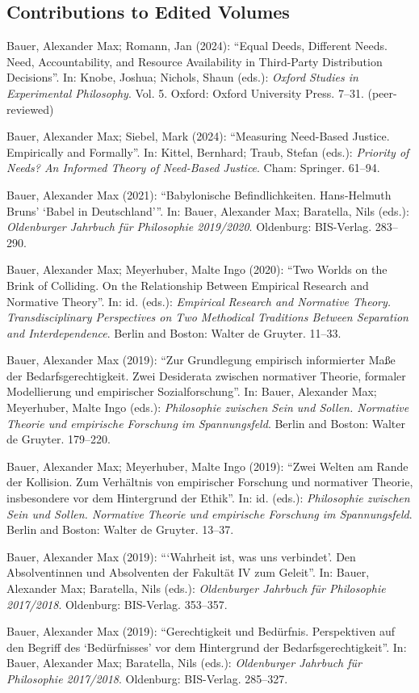 \documentclass[a4paper,10pt]{article}
\newenvironment{literature}{%
   \parskip6pt\parindent0pt\raggedright
   \def\lititem{\hangindent=1cm\hangafter1}}{%
   \par\ignorespaces}
\begin{document}
\subsection*{Contributions to Edited Volumes}
\begin{literature}
\lititem Bauer, Alexander Max; Romann, Jan (2024): \enquote{Equal Deeds, Different Needs. Need, Accountability, and Resource Availability in Third-Party Distribution Decisions}. In: Knobe, Joshua; Nichols, Shaun (eds.): \textit{Oxford Studies in Experimental Philosophy}. Vol. 5. Oxford: Oxford University Press. 7--31. (peer-reviewed)

\lititem Bauer, Alexander Max; Siebel, Mark (2024): \enquote{Measuring Need-Based Justice. Empirically and Formally}. In: Kittel, Bernhard; Traub, Stefan (eds.): \textit{Priority of Needs? An Informed Theory of Need-Based Justice}. Cham: Springer. 61--94.

\lititem Bauer, Alexander Max (2021): \enquote{Babylonische Befindlichkeiten. Hans-Helmuth Bruns' \enquote{Babel in Deutschland}}. In: Bauer, Alexander Max; Baratella, Nils (eds.): \textit{Oldenburger Jahrbuch für Philosophie 2019/2020}. Oldenburg: BIS-Verlag. 283--290.

\lititem Bauer, Alexander Max; Meyerhuber, Malte Ingo (2020): \enquote{Two Worlds on the Brink of Colliding. On the Relationship Between Empirical Research and Normative Theory}. In: id. (eds.): \textit{Empirical Research and Normative Theory. Transdisciplinary Perspectives on Two Methodical Traditions Between Separation and Interdependence}. Berlin and Boston: Walter de Gruyter. 11--33.

\lititem Bauer, Alexander Max (2019): \enquote{Zur Grundlegung empirisch informierter Maße der Bedarfsgerechtigkeit. Zwei Desiderata zwischen normativer Theorie, formaler Modellierung und empirischer Sozialforschung}. In: Bauer, Alexander Max; Meyerhuber, Malte Ingo (eds.): \textit{Philosophie zwischen Sein und Sollen. Normative Theorie und empirische Forschung im Spannungsfeld}. Berlin and Boston: Walter de Gruyter. 179--220.

\lititem Bauer, Alexander Max; Meyerhuber, Malte Ingo (2019): \enquote{Zwei Welten am Rande der Kollision. Zum Verhältnis von empirischer Forschung und normativer Theorie, insbesondere vor dem Hintergrund der Ethik}. In: id. (eds.): \textit{Philosophie zwischen Sein und Sollen. Normative Theorie und empirische Forschung im Spannungsfeld}. Berlin and Boston: Walter de Gruyter. 13--37.

\lititem Bauer, Alexander Max (2019): \enquote{\enquote{Wahrheit ist, was uns verbindet}. Den Absolventinnen und Absolventen der Fakultät IV zum Geleit}. In: Bauer, Alexander Max; Baratella, Nils (eds.): \textit{Oldenburger Jahrbuch für Philosophie 2017/2018}. Oldenburg: BIS-Verlag. 353--357.

\lititem Bauer, Alexander Max (2019): \enquote{Gerechtigkeit und Bedürfnis. Perspektiven auf den Begriff des \enquote{Bedürfnisses} vor dem Hintergrund der Bedarfsgerechtigkeit}. In: Bauer, Alexander Max; Baratella, Nils (eds.): \textit{Oldenburger Jahrbuch für Philosophie 2017/2018}. Oldenburg: BIS-Verlag. 285--327.
\end{literature}
\end{document}
